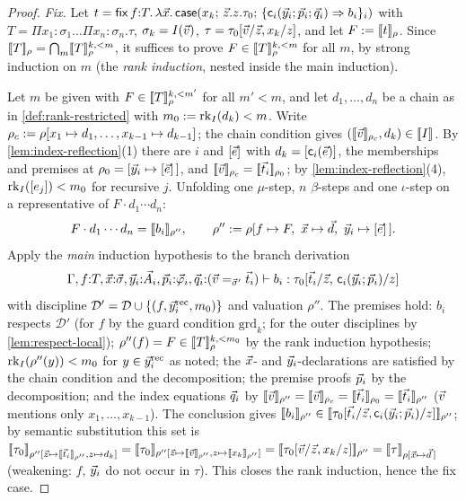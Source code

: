 \begin{proof}
\emph{Fix.}  Let
$t = \mathsf{fix}\,f{:}T.\,\lambda \vec{x}.\,\mathsf{case}(x_k;\,\vec{z}.z.\tau_0;\,\{\mathsf{c}_i(\vec{y}_i;\vec{p}_i;\vec{q}_i) \Rightarrow b_i\}_i)$ with
$T = \Pi x_1{:}\sigma_1 \dots \Pi x_n{:}\sigma_n.\tau$, $\sigma_k =
I(\vec{v})$, $\tau = \tau_0[\vec{v}/\vec{z}, x_k/z]$, and let $F \mathrel{:=}
[\![ t ]\!]_\rho$.  Since $[\![ T ]\!]_{\rho} = \bigcap_m
[\![ T ]\!]_{\rho}^{k,<m}$, it suffices to prove $F \in
[\![ T ]\!]_{\rho}^{k,<m}$ for all $m$, by strong induction on $m$ (the
\emph{rank induction}, nested inside the main induction).

Let $m$ be given with $F \in [\![ T ]\!]_{\rho}^{k,<m'}$ for all $m' < m$,
and let $d_1, \dots, d_n$ be a chain as in \cref{def:rank-restricted}
with $m_0 \mathrel{:=} \mathrm{rk}_{I}(d_k) < m$.  Write $\rho_c \mathrel{:=} \rho[x_1
\mapsto d_1, \dots, x_{k-1} \mapsto d_{k-1}]$; the chain condition gives
$([\![ \vec{v} ]\!]_{\rho_c}, d_k) \in [\![ I ]\!]_{}$.  By
\cref{lem:index-reflection}(1) there are $i$ and $[\vec{e}]$ with
$d_k = [\mathsf{c}_i(\vec{e})]$, the memberships and premises at
$\rho_0 = [\vec{y}_i \mapsto [\vec{e}]\,]$, and
$[\![ \vec{v} ]\!]_{\rho_c} = [\![ \vec{t}_i ]\!]_{\rho_0}$; by
\cref{lem:index-reflection}(4), $\mathrm{rk}_{I}([e_j]) < m_0$ for
recursive $j$.  Unfolding one $\mu$-step, $n$ $\beta$-steps and one
$\iota$-step on a representative of $F \cdot d_1 \cdots d_n$:
\[
  F \cdot d_1 \cdots d_n = [\![ b_i ]\!]_{\rho''}, \qquad
  \rho'' \mathrel{:=} \rho[f \mapsto F,\ \vec{x} \mapsto \vec{d},\
  \vec{y}_i \mapsto [\vec{e}]\,].
\]
Apply the \emph{main} induction hypothesis to the branch derivation
\[
  \Gamma, f{:}T, \vec{x}{:}\vec{\sigma},
  \vec{y}_i{:}\vec{A}_i, \vec{p}_i{:}\vec{\varphi}_i,
  \vec{q}_i{:}(\vec{v} =_{\vec{\sigma}'} \vec{t}_i)
  \vdash b_i : \tau_0[\vec{t}_i/\vec{z},\,
    \mathsf{c}_i(\vec{y}_i;\vec{p}_i)/z]
\]
with discipline $\mathcal{D}' = \mathcal{D} \cup \{(f,
\vec{y}_i^{\mathrm{rec}}, m_0)\}$ and valuation $\rho''$.  The premises
hold: $b_i$ respects $\mathcal{D}'$ (for $f$ by the guard condition
$\mathrm{grd}_k$; for the outer disciplines by
\cref{lem:respect-local}); $\rho''(f) = F \in [\![ T ]\!]_{\rho}^{k,<m_0}$
by the rank induction hypothesis; $\mathrm{rk}_{I}(\rho''(y)) < m_0$ for $y \in
\vec{y}_i^{\mathrm{rec}}$ as noted; the $\vec{x}$- and
$\vec{y}_i$-declarations are satisfied by the chain condition and the
decomposition; the premise proofs $\vec{p}_i$ by the decomposition; and
the index equations $\vec{q}_i$ by $\sem{\tup{v}}_{\rho''} =
\sem{\tup{v}}_{\rho_c} = \sem{\tup{t}_i}_{\rho_0} =
\sem{\tup{t}_i}_{\rho''}$ ($\vec{v}$ mentions only $x_1, \dots,
x_{k-1}$).  The conclusion gives $[\![ b_i ]\!]_{\rho''} \in
[\![ \tau_0[\vec{t}_i/\vec{z}, \mathsf{c}_i(\vec{y}_i;\vec{p}_i)/z] ]\!]_{\rho''}$; by semantic substitution this set is
$\semr{\tau_0}{\rho''[\tup{z} \mapsto \sem{\tup{t}_i}_{\rho''}, z
\mapsto d_k]} = \semr{\tau_0}{\rho''[\tup{z} \mapsto
\sem{\tup{v}}_{\rho''}, z \mapsto \sem{x_k}_{\rho''}]} =
\semr{\tau_0[\tup{v}/\tup{z}, x_k/z]}{\rho''} =
\semr{\tau}{\rho[\tup{x} \mapsto \tup{d}\,]}$ (weakening: $f$,
$\vec{y}_i$ do not occur in $\tau$).  This closes the rank induction,
hence the fix case.


\end{proof}
